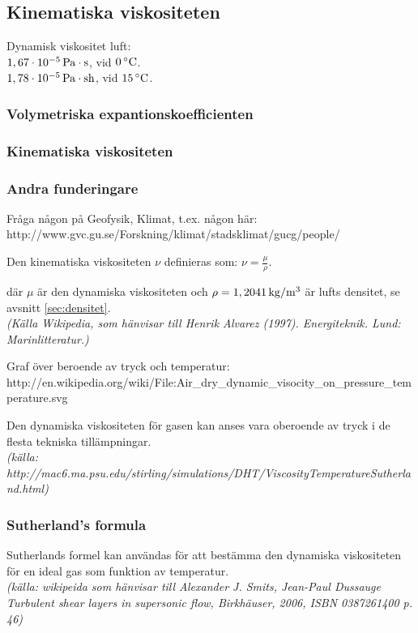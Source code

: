 
\subsection{Kinematiska viskositeten} %
Dynamisk viskositet luft:\\
$\unit[1,67\cdot10^{-5}]{Pa\cdot s}$, vid $\unit[0]{^\circ C}$.\\
$\unit[1,78\cdot10^{-5}]{Pa\cdot sh}$, vid $\unit[15]{^\circ C}$.


\subsubsection{Volymetriska expantionskoefficienten}

\subsubsection{Kinematiska viskositeten}

\subsubsection{Andra funderingare}
Fråga någon på Geofysik, Klimat, t.ex. någon här: http://www.gvc.gu.se/Forskning/klimat/stadsklimat/gucg/people/


Den kinematiska viskositeten $\nu$ definieras som: $\nu = \frac {\mu} {\rho}.$


där $\mu$ är den dynamiska viskositeten och $\rho=\unit[1,2041]{kg/m^3}$ är lufts densitet, se avsnitt \ref{sec:densitet}.\\
\emph{(Källa Wikipedia, som hänvisar till Henrik Alvarez (1997). Energiteknik. Lund: Marinlitteratur.)}

Graf över beroende av tryck och temperatur:\\
http://en.wikipedia.org/wiki/File:Air\_dry\_dynamic\_visocity\_on\_pressure\_temperature.svg

Den dynamiska viskositeten för gasen kan anses vara oberoende av tryck i de flesta tekniska tillämpningar. \\
\emph{(källa: http://mac6.ma.psu.edu/stirling/simulations/DHT/ViscosityTemperatureSutherland.html)}

\subsubsection{Sutherland's formula}
Sutherlands formel kan användas för att bestämma den dynamiska viskositeten för en ideal gas som funktion av temperatur.\\
\emph{(källa: wikipeida som hänvisar till Alexander J. Smits, Jean-Paul Dussauge Turbulent shear layers in supersonic flow, Birkhäuser, 2006, ISBN 0387261400 p. 46)}

